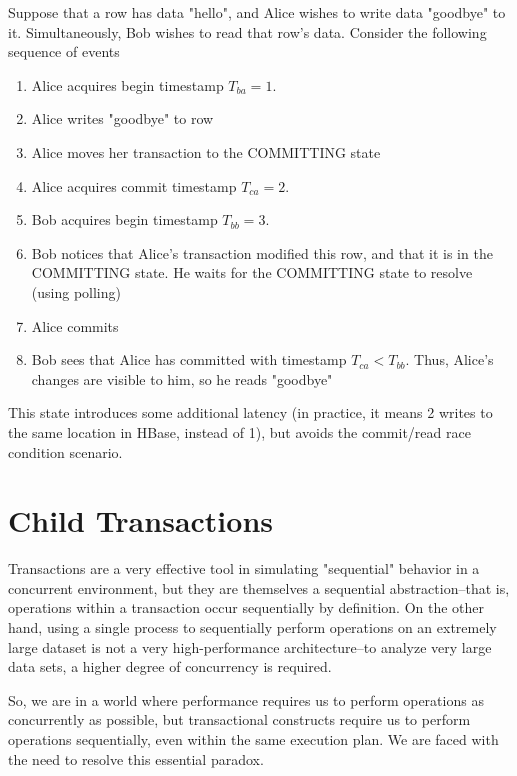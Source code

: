 \begin{exmp}
				Suppose that a row has data "hello", and Alice wishes to write data "goodbye" to it. Simultaneously, Bob wishes to read that row's data. Consider the following sequence of events
				\begin{enumerate}
					\item Alice acquires begin timestamp $T_{ba} = 1$.
					\item Alice writes "goodbye" to row
					\item Alice moves her transaction to the COMMITTING state
					\item Alice acquires commit timestamp $T_{ca} = 2$.
					\item Bob acquires begin timestamp $T_{bb} = 3$.
					\item Bob notices that Alice's transaction modified this row, and that it is in the COMMITTING state. He waits for the COMMITTING state to resolve (using polling)
					\item Alice commits
					\item Bob sees that Alice has committed with timestamp $T_{ca} < T_{bb}$. Thus, Alice's changes are visible to him, so he reads "goodbye"
				\end{enumerate}
\end{exmp}

This state introduces some additional latency (in practice, it means 2 writes to the same location in HBase, instead of 1), but avoids the commit/read race condition scenario.

\section{Child Transactions}
Transactions are a very effective tool in simulating "sequential" behavior in a concurrent environment, but they are themselves a sequential abstraction--that is, operations within a transaction occur sequentially by definition. On the other hand, using a single process to sequentially perform operations on an extremely large dataset is not a very high-performance architecture--to analyze very large data sets, a higher degree of concurrency is required.

So, we are in a world where performance requires us to perform operations as concurrently as possible, but transactional constructs require us to perform operations sequentially, even within the same execution plan. We are faced with the need to resolve this essential paradox.

